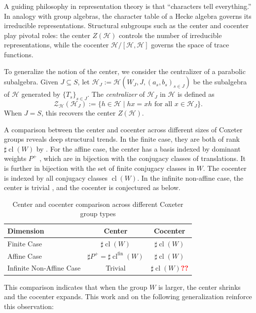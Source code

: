 \documentclass[a4paper, reqno, 14pt]{amsart}
\def\ch{\mathcal{H}}
\DeclareMathOperator{\cl}{cl}
\theoremstyle{definition}
\theoremstyle{remark}
\numberwithin{equation}{section}
\numberwithin{thm}{section}
\begin{document}
A guiding philosophy in representation theory is that ``characters tell everything.'' In analogy with group algebras, the character table of a Hecke algebra governs its irreducible representations. Structural subgroups such as the center and cocenter play pivotal roles: the center $Z(\mathcal{H})$ controls the number of irreducible representations, while the cocenter $\mathcal{H}/[\mathcal{H},\mathcal{H}]$ governs the space of trace functions. 

To generalize the notion of the center, we consider the centralizer of a parabolic subalgebra. Given $J \subseteq S$, let $\ch_J:=\mathcal{H}(W_J,J,(a_s,b_s)_{s\in J})$ be the subalgebra of $\ch$ generated by $\{T_s\}_{s \in J}$. The \emph{centralizer} of $\ch_J$ in $\ch$ is defined as
\[
\mathcal{Z}_{\ch}(\ch_J) := \{ h \in \ch \mid h x = x h \text{ for all } x \in \ch_J \}.
\]
When $J = S$, this recovers the center $Z(\mathcal{H})$. 

A comparison between the center and cocenter across different sizes of Coxeter groups reveals deep structural trends. In the finite case, they are both of rank $\sharp\cl(W)$ by \cite{geck2000characters}. For the affine case, the center has a basis indexed by dominant weights $P^+$ \cite{lusztig1989affine}, which are in bijection with the conjugacy classes of translations. It is further in bijection with the set of finite conjugacy classes in $W$. The cocenter \cite{he2014minimal} is indexed by all conjugacy classes $\cl(W)$. In the infinite non-affine case, the center is trivial \cite{marquis2024centre}, and the cocenter is conjectured as below. 
\begin{table}[H]
\centering
\begin{tabular}{|l|c|c|}
\hline
\textbf{Dimension} & \textbf{Center} & \textbf{Cocenter} \\
\hline
Finite Case & $\sharp \cl(W)$ & $\sharp \cl(W)$ \\
\hline
Affine Case & $\sharp P^+ = \sharp \cl^{\mathrm{fin}}(W)$\footnotemark & $\sharp \cl(W)$ \\
\hline
Infinite Non-Affine Case & Trivial & $\sharp \cl(W)$\textbf{\textcolor{red}{??}} \\
\hline
\end{tabular}
\caption{Center and cocenter comparison across different Coxeter group types}
\end{table}

This comparison indicates that when the group $W$ is larger, the center shrinks and the cocenter expands.  This work and \cite{partialcocenterADLV} on the following generalization reinforce this observation:
\end{document}
